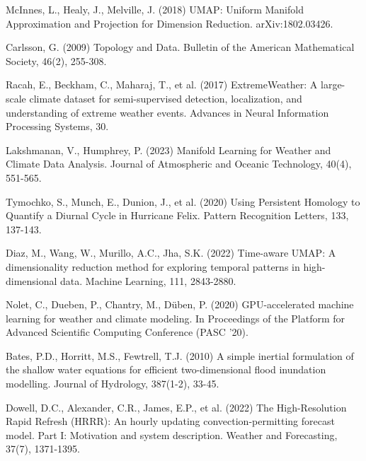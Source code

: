 \documentclass{article}
\begin{document}
\begin{thebibliography}{99}
 McInnes, L., Healy, J., Melville, J. (2018) UMAP: Uniform Manifold Approximation and Projection for Dimension Reduction. arXiv:1802.03426.

 Carlsson, G. (2009) Topology and Data. Bulletin of the American Mathematical Society, 46(2), 255-308.

 Racah, E., Beckham, C., Maharaj, T., et al. (2017) ExtremeWeather: A large-scale climate dataset for semi-supervised detection, localization, and understanding of extreme weather events. Advances in Neural Information Processing Systems, 30.

 Lakshmanan, V., Humphrey, P. (2023) Manifold Learning for Weather and Climate Data Analysis. Journal of Atmospheric and Oceanic Technology, 40(4), 551-565.

 Tymochko, S., Munch, E., Dunion, J., et al. (2020) Using Persistent Homology to Quantify a Diurnal Cycle in Hurricane Felix. Pattern Recognition Letters, 133, 137-143.

 Diaz, M., Wang, W., Murillo, A.C., Jha, S.K. (2022) Time-aware UMAP: A dimensionality reduction method for exploring temporal patterns in high-dimensional data. Machine Learning, 111, 2843-2880.

 Nolet, C., Dueben, P., Chantry, M., Düben, P. (2020) GPU-accelerated machine learning for weather and climate modeling. In Proceedings of the Platform for Advanced Scientific Computing Conference (PASC '20).

 Bates, P.D., Horritt, M.S., Fewtrell, T.J. (2010) A simple inertial formulation of the shallow water equations for efficient two-dimensional flood inundation modelling. Journal of Hydrology, 387(1-2), 33-45.

 Dowell, D.C., Alexander, C.R., James, E.P., et al. (2022) The High-Resolution Rapid Refresh (HRRR): An hourly updating convection-permitting forecast model. Part I: Motivation and system description. Weather and Forecasting, 37(7), 1371-1395.


\end{thebibliography}
\end{document}
